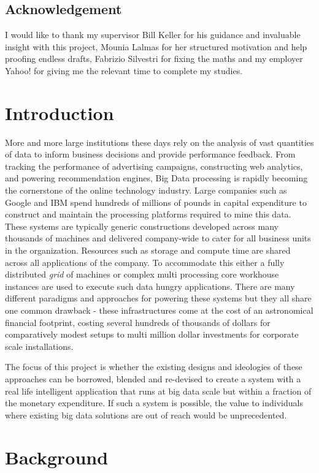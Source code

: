 \documentclass[a4paper,11pt]{scrreprt}
\begin{document}
\section*{Acknowledgement}
I would like to thank my supervisor Bill Keller for his guidance and invaluable insight with this project, Mounia Lalmas for her structured motivation and help proofing endless drafts, Fabrizio Silvestri for fixing the maths and my employer Yahoo! for giving me the relevant time to complete my studies.


\tableofcontents

\chapter{Introduction}
More and more large institutions these days rely on the analysis of vast quantities of data to inform business decisions and provide performance feedback. From tracking the performance of advertising campaigns, constructing web analytics, and powering recommendation engines, Big Data processing is rapidly becoming the cornerstone of the online technology industry. Large companies such as Google and IBM spend hundreds of millions of pounds in capital expenditure to construct and maintain the processing platforms required to mine this data. These systems are typically generic constructions developed across many thousands of machines and delivered company-wide to cater for all business units in the organization. Resources such as storage and compute time are shared across all applications of the company. To accommodate this either a fully distributed \textit{grid} of machines or complex multi processing core workhouse instances are used to execute such data hungry applications. There are many different paradigms and approaches for powering these systems but they all share one common drawback - these infrastructures come at the cost of an astronomical financial footprint, costing several hundreds of thousands of dollars for comparatively modest setups to multi million dollar investments for corporate scale installations.

The focus of this project is whether the existing designs and ideologies of these approaches can be borrowed, blended and re-devised to create a system with a real life intelligent application that runs at big data scale but within a fraction of the monetary expenditure. If such a system is possible, the value to individuals where existing big data solutions are out of reach would be unprecedented.

\chapter{Background}
\end{document}
